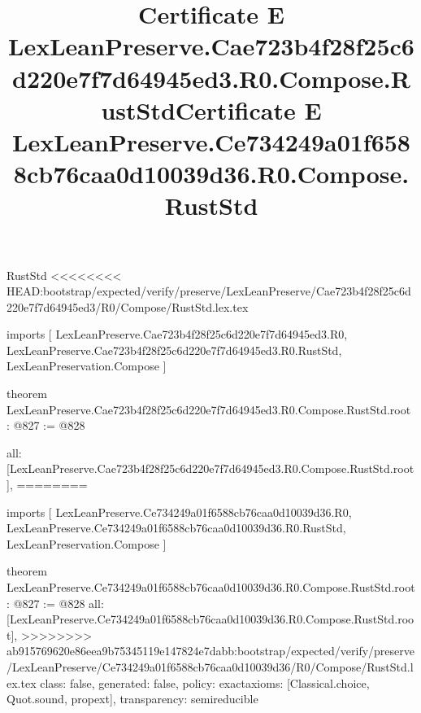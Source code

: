 \begin{lexlean}{RustStd}
<<<<<<<< HEAD:bootstrap/expected/verify/preserve/LexLeanPreserve/Cae723b4f28f25c6d220e7f7d64945ed3/R0/Compose/RustStd.lex.tex
\title{Certificate E LexLeanPreserve.Cae723b4f28f25c6d220e7f7d64945ed3.R0.Compose.RustStd}
\begin{coremodule}
imports [
  LexLeanPreserve.Cae723b4f28f25c6d220e7f7d64945ed3.R0,
  LexLeanPreserve.Cae723b4f28f25c6d220e7f7d64945ed3.R0.RustStd,
  LexLeanPreservation.Compose
]

theorem LexLeanPreserve.Cae723b4f28f25c6d220e7f7d64945ed3.R0.Compose.RustStd.root : @827 := @828 {
  all: [LexLeanPreserve.Cae723b4f28f25c6d220e7f7d64945ed3.R0.Compose.RustStd.root],
========
\title{Certificate E LexLeanPreserve.Ce734249a01f6588cb76caa0d10039d36.R0.Compose.RustStd}
\begin{coremodule}
imports [
  LexLeanPreserve.Ce734249a01f6588cb76caa0d10039d36.R0,
  LexLeanPreserve.Ce734249a01f6588cb76caa0d10039d36.R0.RustStd,
  LexLeanPreservation.Compose
]

theorem LexLeanPreserve.Ce734249a01f6588cb76caa0d10039d36.R0.Compose.RustStd.root : @827 := @828 {
  all: [LexLeanPreserve.Ce734249a01f6588cb76caa0d10039d36.R0.Compose.RustStd.root],
>>>>>>>> ab915769620e86eea9b75345119e147824e7dabb:bootstrap/expected/verify/preserve/LexLeanPreserve/Ce734249a01f6588cb76caa0d10039d36/R0/Compose/RustStd.lex.tex
  class: false,
  generated: false,
  policy: exact{axioms: [Classical.choice, Quot.sound, propext]},
  transparency: semireducible
}


\end{coremodule}}
\end{coremodule}
\end{lexlean}
